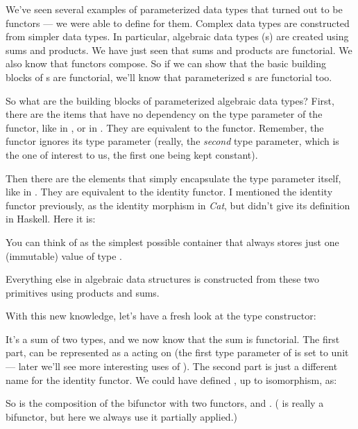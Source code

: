 We've seen several examples of parameterized data types that turned out
to be functors --- we were able to define  for them.
Complex data types are constructed from simpler data types. In
particular, algebraic data types (s) are created using sums and
products. We have just seen that sums and products are functorial. We
also know that functors compose. So if we can show that the basic
building blocks of s are functorial, we'll know that parameterized
s are functorial too.

So what are the building blocks of parameterized algebraic data types?
First, there are the items that have no dependency on the type parameter
of the functor, like  in , or 
in . They are equivalent to the  functor.
Remember, the  functor ignores its type parameter (really,
the \emph{second} type parameter, which is the one of interest to us,
the first one being kept constant).

Then there are the elements that simply encapsulate the type parameter
itself, like  in . They are equivalent to the
identity functor. I mentioned the identity functor previously, as the
identity morphism in \emph{Cat}, but didn't give its definition in
Haskell. Here it is:


You can think of  as the simplest possible container
that always stores just one (immutable) value of type .

Everything else in algebraic data structures is constructed from these
two primitives using products and sums.

With this new knowledge, let's have a fresh look at the 
type constructor:

It's a sum of two types, and we now know that the sum is functorial. The
first part,  can be represented as a 
acting on  (the first type parameter of  is set
to unit --- later we'll see more interesting uses of ).
The second part is just a different name for the identity functor. We
could have defined , up to isomorphism, as:

So  is the composition of the bifunctor 
with two functors,  and .
( is really a bifunctor, but here we always use it
partially applied.)

